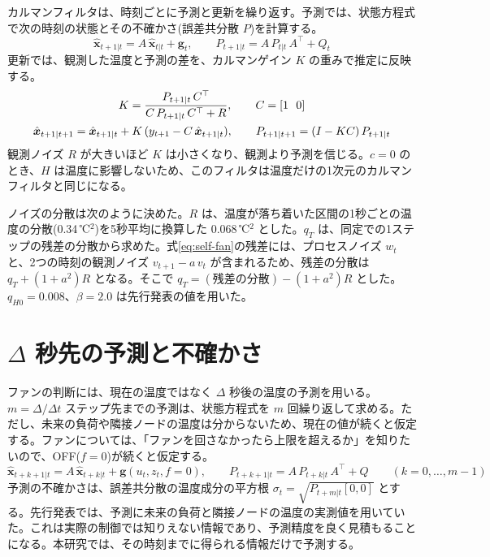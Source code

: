 カルマンフィルタは、時刻ごとに予測と更新を繰り返す。予測では、状態方程式で次の時刻の状態とその不確かさ(誤差共分散 $P$)を計算する。
\begin{equation}
  \hat{\bm{x}}_{t+1|t} = A\,\hat{\bm{x}}_{t|t} + \bm{g}_t,\qquad
  P_{t+1|t} = A\,P_{t|t}\,A^\top + Q_t
\end{equation}
更新では、観測した温度と予測の差を、カルマンゲイン $K$ の重みで推定に反映する。
\begin{gather}
  K = \frac{P_{t+1|t}\,C^\top}{C\,P_{t+1|t}\,C^\top + R},\qquad C = [1\ \ 0] \notag\\
  \hat{\bm{x}}_{t+1|t+1} = \hat{\bm{x}}_{t+1|t} + K\,(y_{t+1} - C\,\hat{\bm{x}}_{t+1|t}),\qquad
  P_{t+1|t+1} = (I - K C)\,P_{t+1|t}
\end{gather}
観測ノイズ $R$ が大きいほど $K$ は小さくなり、観測より予測を信じる。$c = 0$ のとき、$H$ は温度に影響しないため、このフィルタは温度だけの1次元のカルマンフィルタと同じになる。

ノイズの分散は次のように決めた。$R$ は、温度が落ち着いた区間の1秒ごとの温度の分散(0.34\,℃$^2$)を5秒平均に換算した 0.068\,℃$^2$ とした。$q_T$ は、同定での1ステップの残差の分散から求めた。式\eqref{eq:self-fan}の残差には、プロセスノイズ $w_t$ と、2つの時刻の観測ノイズ $v_{t+1} - a\,v_t$ が含まれるため、残差の分散は $q_T + (1+a^2)R$ となる。そこで $q_T = (\text{残差の分散}) - (1+a^2)R$ とした。$q_{H0} = 0.008$、$\beta = 2.0$ は先行発表の値を用いた。

\section{$\Delta$ 秒先の予測と不確かさ}\label{sec:method-predict}
ファンの判断には、現在の温度ではなく $\Delta$ 秒後の温度の予測を用いる。$m = \Delta/\Delta t$ ステップ先までの予測は、状態方程式を $m$ 回繰り返して求める。ただし、未来の負荷や隣接ノードの温度は分からないため、現在の値が続くと仮定する。ファンについては、「ファンを回さなかったら上限を超えるか」を知りたいので、OFF($f = 0$)が続くと仮定する。
\begin{equation}
  \hat{\bm{x}}_{t+k+1|t} = A\,\hat{\bm{x}}_{t+k|t} + \bm{g}(u_t, z_t, f{=}0),\qquad
  P_{t+k+1|t} = A\,P_{t+k|t}\,A^\top + Q \qquad (k = 0, \dots, m-1)
\end{equation}
予測の不確かさは、誤差共分散の温度成分の平方根 $\sigma_t = \sqrt{P_{t+m|t}[0,0]}$ とする。先行発表では、予測に未来の負荷と隣接ノードの温度の実測値を用いていた。これは実際の制御では知りえない情報であり、予測精度を良く見積もることになる。本研究では、その時刻までに得られる情報だけで予測する。

